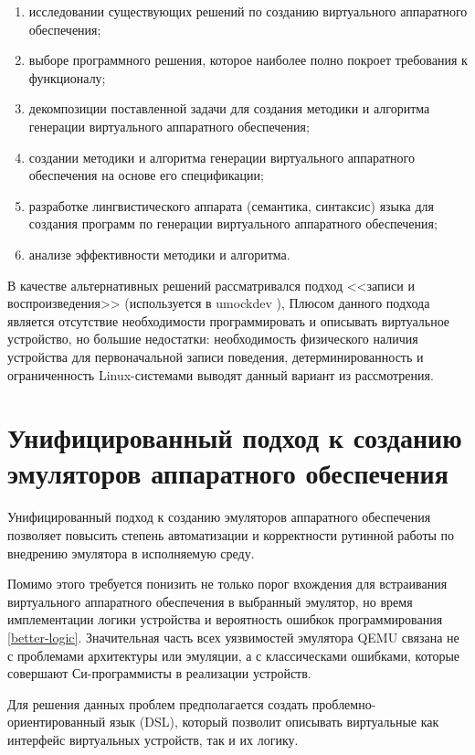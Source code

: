 \begin{enumerate}[label={\arabic*)}]
    \item исследовании существующих решений по созданию виртуального аппаратного обеспечения;
    \item выборе программного решения, которое наиболее полно покроет требования к функционалу;
    \item декомпозиции поставленной задачи для создания методики и алгоритма генерации виртуального аппаратного обеспечения;
    \item создании методики и алгоритма генерации виртуального аппаратного обеспечения на основе его спецификации;
    \item разработке лингвистического аппарата (семантика, синтаксис) языка для создания программ по генерации виртуального
        аппаратного обеспечения;
    \item анализе эффективности методики и алгоритма.
\end{enumerate}

В качестве альтернативных решений рассматривался подход <<записи и воспроизведения>> (используется в umockdev \cite{umockdev}),
Плюсом данного подхода является отсутствие необходимости программировать и описывать виртуальное устройство,
но большие недостатки: необходимость физического наличия устройства для первоначальной записи
поведения, детерминированность и ограниченность Linux-системами выводят данный вариант из рассмотрения.


\section{Унифицированный подход к созданию эмуляторов аппаратного обеспечения}\label{sec:ch1/sec4}

Унифицированный подход к созданию эмуляторов аппаратного обеспечения позволяет
повысить степень автоматизации и корректности рутинной работы по внедрению
эмулятора в исполняемую среду.

Помимо этого требуется понизить не только порог вхождения для встраивания виртуального аппаратного обеспечения
в выбранный эмулятор, но время имплементации логики устройства и вероятность ошибкок программирования \ref{better-logic}.
Значительная часть всех уязвимостей эмулятора QEMU связана не с проблемами архитектуры или эмуляции,
а с классическами ошибками, которые совершают Си-программисты в реализации устройств.


Для решения данных проблем предполагается создать проблемно-ориентированный язык (DSL), который позволит
описывать виртуальные как интерфейс виртуальных устройств, так и их логику.

